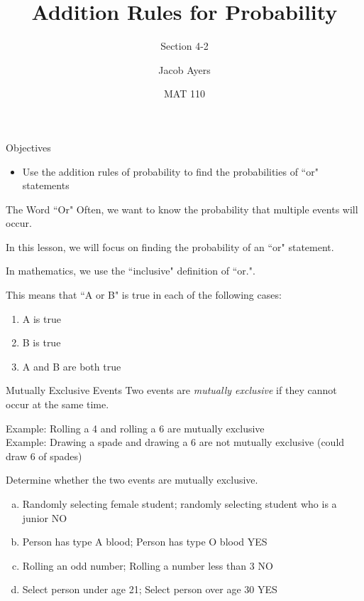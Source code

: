 \documentclass[t, aspectratio=169]{beamer}
\title[4-2]{Addition Rules for Probability}
\subtitle{Section 4-2}
\author{Jacob Ayers}
\institute{Lesson \#10}
\date{MAT 110}
\newcommand{\?}{\stackrel{?}{=}}
\begin{document}
	
	\begin{frame}
		\titlepage
	\end{frame}
	
	\begin{frame}{Objectives}
		\begin{itemize}
			\item Use the addition rules of probability to find the probabilities of ``or" statements
		\end{itemize}
	\end{frame}

	\begin{frame}{The Word ``Or"}
		Often, we want to know the probability that multiple events will occur. \pause
		
		In this lesson, we will focus on finding the probability of an ``or" statement. \pause
		
		In mathematics, we use the ``inclusive" definition of ``or.". \pause
		
		This means that ``A or B" is true in each of the following cases: \begin{enumerate}[1)]
			\item A is true
			\item B is true
			\item A and B are both true
		\end{enumerate}
	\end{frame}

	\begin{frame}{Mutually Exclusive Events}
		Two events are \textit{mutually exclusive} if they cannot occur at the same time. \pause
		
		Example: Rolling a 4 and rolling a 6 are mutually exclusive \pause \\
		Example: Drawing a spade and drawing a 6 are not mutually exclusive (could draw 6 of spades)
		
		Determine whether the two events are mutually exclusive. \begin{enumerate}[a)]
			\item Randomly selecting female student; randomly selecting student who is a junior \pause NO \pause
			\item Person has type A blood; Person has type O blood \pause YES \pause
			\item Rolling an odd number; Rolling a number less than 3 \pause NO \pause
			\item Select person under age 21; Select person over age 30 \pause YES
		\end{enumerate}
	\end{frame}
\end{document}
